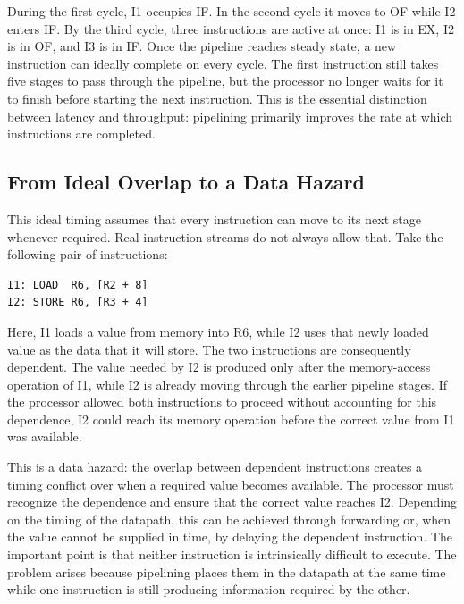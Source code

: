 \documentclass[12pt,a4paper]{report}
\begin{document}
During the first cycle, I1 occupies IF. In the second cycle it moves to OF while I2 enters IF. By the third cycle, three instructions are active at once: I1 is in EX, I2 is in OF, and I3 is in IF. Once the pipeline reaches steady state, a new instruction can ideally complete on every cycle. The first instruction still takes five stages to pass through the pipeline, but the processor no longer waits for it to finish before starting the next instruction. This is the essential distinction between latency and throughput: pipelining primarily improves the rate at which instructions are completed.~\cite{marz-pipelining} ~\cite{hennessy}

\subsection{From Ideal Overlap to a Data Hazard}

This ideal timing assumes that every instruction can move to its next stage whenever required. Real instruction streams do not always allow that. Take the following pair of instructions:

\begin{lstlisting}[caption={A load immediately followed by a dependent store},label={lst:load-store}]
I1: LOAD  R6, [R2 + 8]
I2: STORE R6, [R3 + 4]
\end{lstlisting}

Here, I1 loads a value from memory into R6, while I2 uses that newly loaded value as the data that it will store. The two instructions are consequently dependent. The value needed by I2 is produced only after the memory-access operation of I1, while I2 is already moving through the earlier pipeline stages. If the processor allowed both instructions to proceed without accounting for this dependence, I2 could reach its memory operation before the correct value from I1 was available.

This is a data hazard: the overlap between dependent instructions creates a timing conflict over when a required value becomes available. The processor must recognize the dependence and ensure that the correct value reaches I2. Depending on the timing of the datapath, this can be achieved through forwarding or, when the value cannot be supplied in time, by delaying the dependent instruction. The important point is that neither instruction is intrinsically difficult to execute. The problem arises because pipelining places them in the datapath at the same time while one instruction is still producing information required by the other.
\end{document}
